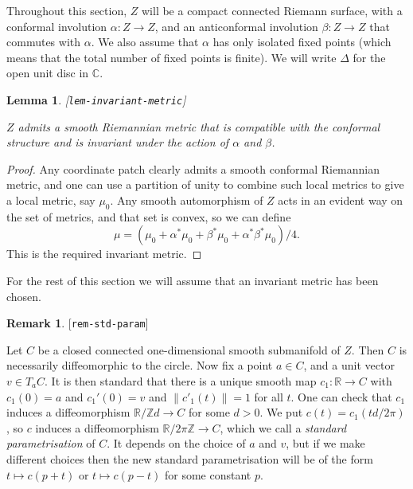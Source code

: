 \documentclass[reqno]{amsart}
\newcommand{\lbl}[1]{\label{#1}\textup{[\texttt{#1}]}\par}
\newcommand{\lbl}{\label}
\newcommand{\Dl}        {\Delta}
\newcommand{\al}        {\alpha}
\newcommand{\bt}        {\beta}
\newcommand{\Z}         {{\mathbb{Z}}}
\newcommand{\R}         {{\mathbb{R}}}
\newcommand{\C}         {{\mathbb{C}}}
\renewcommand{\:}{\colon}
\newtheorem{lemma}[theorem]{Lemma}
\theoremstyle{definition}
\newtheorem{remark}[theorem]{Remark}
\begin{document}
Throughout this section, $Z$ will be a compact connected Riemann
surface, with a conformal involution $\al\:Z\to Z$, and an
anticonformal involution $\bt\:Z\to Z$ that commutes with $\al$.  We
also assume that $\al$ has only isolated fixed points (which means
that the total number of fixed points is finite).  We will write $\Dl$
for the open unit disc in $\C$.

\begin{lemma}\lbl{lem-invariant-metric}
 $Z$ admits a smooth Riemannian metric that is compatible with the
 conformal structure and is invariant under the action of $\al$ and
 $\bt$.
\end{lemma}
\begin{proof}
 Any coordinate patch clearly admits a smooth conformal Riemannian
 metric, and one can use a partition of unity to combine such local
 metrics to give a local metric, say $\mu_0$.  Any smooth automorphism
 of $Z$ acts in an evident way on the set of metrics, and that set is
 convex, so we can define
 \[ \mu = (\mu_0 + \al^*\mu_0 + \bt^*\mu_0 + \al^*\bt^*\mu_0)/4. \]
 This is the required invariant metric.
\end{proof}

For the rest of this section we will assume that an invariant metric
has been chosen.

\begin{remark}\lbl{rem-std-param}
 Let $C$ be a closed connected one-dimensional smooth submanifold of
 $Z$.  Then $C$ is necessarily diffeomorphic to the circle.  Now fix a
 point $a\in C$, and a unit vector $v\in T_aC$.  It is then standard
 that there is a unique smooth map $c_1\:\R\to C$ with $c_1(0)=a$ and
 $c_1'(0)=v$ and $\|c'_1(t)\|=1$ for all $t$.  One can check that
 $c_1$ induces a diffeomorphism $\R/\Z d\to C$ for some $d>0$.  We put
 $c(t)=c_1(td/2\pi)$, so $c$ induces a diffeomorphism
 $\R/2\pi\Z\to C$, which we call a \emph{standard parametrisation}
 of $C$.  It depends on the choice of $a$ and $v$, but if we make
 different choices then the new standard parametrisation will be of
 the form $t\mapsto c(p+t)$ or $t\mapsto c(p-t)$ for some constant $p$.
\end{remark}
\end{document}
